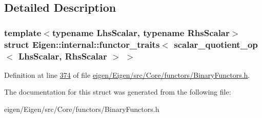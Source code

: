 \subsection{Detailed Description}
\subsubsection*{template$<$typename Lhs\+Scalar, typename Rhs\+Scalar$>$\newline
struct Eigen\+::internal\+::functor\+\_\+traits$<$ scalar\+\_\+quotient\+\_\+op$<$ Lhs\+Scalar, Rhs\+Scalar $>$ $>$}



Definition at line \hyperlink{eigen_2_eigen_2src_2_core_2functors_2_binary_functors_8h_source_l00374}{374} of file \hyperlink{eigen_2_eigen_2src_2_core_2functors_2_binary_functors_8h_source}{eigen/\+Eigen/src/\+Core/functors/\+Binary\+Functors.\+h}.



The documentation for this struct was generated from the following file\+:\begin{DoxyCompactItemize}
\item 
eigen/\+Eigen/src/\+Core/functors/\+Binary\+Functors.\+h\end{DoxyCompactItemize}

